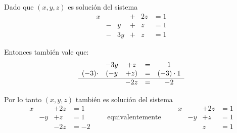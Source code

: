 \documentclass[handout]{beamer} %
\renewcommand{\_}[1]{_{\left( #1 \right)}}
\renewcommand{\^}[1]{^{\left( #1 \right)}}
\begin{document}
\begin{frame}
Dado que $(x,y,z)$ es solución del sistema
\begin{equation*}
    \begin{matrix}
        x & & & +&2z & = 1 \\
        & -&y & +&z & =1\\
        & -&3y & +&z & = 1 
    \end{matrix}
\end{equation*}

 
Entonces también vale que: 
\begin{equation*}
\begin{matrix}
& -3y & +z & = & 1 \\
(-3)\cdot&( -y & +z) & = &(-3)\cdot1 \\
\hline
&   & -2z & = & -2  
\end{matrix}
\end{equation*}

 \pause
Por lo tanto $(x,y,z)$ también es solución del sistema
\begin{equation*}
\begin{matrix}
x &  & +2z & = 1 \\
& -y & +z & =1 \\
&    & -2z & = -2
\end{matrix}
\qquad\mbox{equivalentemente}\qquad
\begin{matrix}
x &  & +2z & = 1 \\
& -y & +z & =1 \\
&    & z & = 1
\end{matrix}
\end{equation*}
\end{frame}
\end{document}
